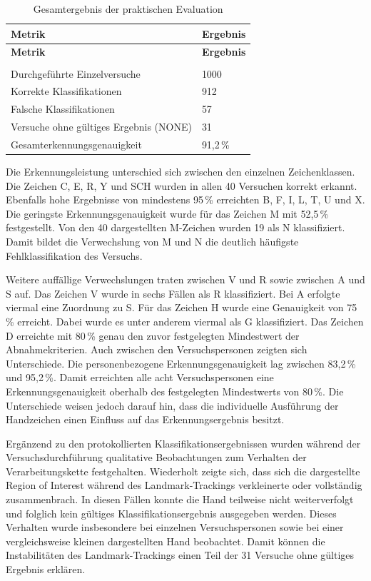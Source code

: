\begin{longtable}{|p{}|p{}|}
    \hline
    \textbf{Metrik} & \textbf{Ergebnis} \\
    \hline
    \endfirsthead
    \hline
    \textbf{Metrik} & \textbf{Ergebnis} \\
    \hline
    \endhead
    \caption{Gesamtergebnis der praktischen Evaluation}
    \label{tab:gesamtergebnis-praktische-evaluation} \\
    \endlastfoot
    Durchgeführte Einzelversuche & 1000 \\
    \hline
    Korrekte Klassifikationen & 912 \\
    \hline
    Falsche Klassifikationen & 57 \\
    \hline
    Versuche ohne gültiges Ergebnis (NONE) & 31 \\
    \hline
    Gesamterkennungsgenauigkeit & 91,2\,\% \\
    \hline
\end{longtable}

Die Erkennungsleistung unterschied sich zwischen den einzelnen Zeichenklassen. Die Zeichen C, E, R, Y und SCH wurden in allen 40 Versuchen korrekt erkannt. Ebenfalls hohe Ergebnisse von mindestens 95\,\% erreichten B, F, I, L, T, U und X. Die geringste Erkennungsgenauigkeit wurde für das Zeichen M mit 52,5\,\% festgestellt. Von den 40 dargestellten M-Zeichen wurden 19 als N klassifiziert. Damit bildet die Verwechslung von M und N die deutlich häufigste Fehlklassifikation des Versuchs.

Weitere auffällige Verwechslungen traten zwischen V und R sowie zwischen A und S auf. Das Zeichen V wurde in sechs Fällen als R klassifiziert. Bei A erfolgte viermal eine Zuordnung zu S. Für das Zeichen H wurde eine Genauigkeit von 75\,\% erreicht. Dabei wurde es unter anderem viermal als G klassifiziert. Das Zeichen D erreichte mit 80\,\% genau den zuvor festgelegten Mindestwert der Abnahmekriterien. Auch zwischen den Versuchspersonen zeigten sich Unterschiede. Die personenbezogene Erkennungsgenauigkeit lag zwischen 83,2\,\% und 95,2\,\%. Damit erreichten alle acht Versuchspersonen eine Erkennungsgenauigkeit oberhalb des festgelegten Mindestwerts von 80\,\%. Die Unterschiede weisen jedoch darauf hin, dass die individuelle Ausführung der Handzeichen einen Einfluss auf das Erkennungsergebnis besitzt.

Ergänzend zu den protokollierten Klassifikationsergebnissen wurden während der Versuchsdurchführung qualitative Beobachtungen zum Verhalten der Verarbeitungskette festgehalten. Wiederholt zeigte sich, dass sich die dargestellte Region of Interest während des Landmark-Trackings verkleinerte oder vollständig zusammenbrach. In diesen Fällen konnte die Hand teilweise nicht weiterverfolgt und folglich kein gültiges Klassifikationsergebnis ausgegeben werden. Dieses Verhalten wurde insbesondere bei einzelnen Versuchspersonen sowie bei einer vergleichsweise kleinen dargestellten Hand beobachtet. Damit können die Instabilitäten des Landmark-Trackings einen Teil der 31 Versuche ohne gültiges Ergebnis erklären.

